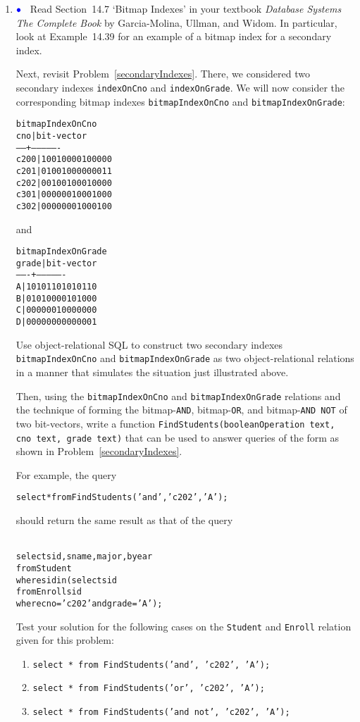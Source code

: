 \documentclass{article}
\newcommand{\bluebullet}{$\textcolor{blue}{\bullet}$}
\newcommand{\blue}[1]{{\color{blue}#1}}
\begin{document}
\begin{enumerate}[resume]
\item \bluebullet\ %
Read Section~14.7 `Bitmap Indexes' in your textbook \emph{Database Systems The Complete Book} by Garcia-Molina, Ullman, and Widom.   In particular, look at Example~14.39 for an example of a bitmap index for a secondary index.

Next, revisit Problem~\ref{secondaryIndexes}.   There, we considered two secondary indexes {\tt indexOnCno} and
{\tt indexOnGrade}.  We will now consider the corresponding bitmap indexes
{\tt bitmapIndexOnCno} and {\tt bitmapIndexOnGrade}:

{\footnotesize
\begin{alltt}
bitmapIndexOnCno
 cno  |     bit-vector     
------+----------------
 c200 | 10010000100000
 c201 | 01001000000011
 c202 | 00100100010000
 c301 | 00000010001000
 c302 | 00000001000100
\end{alltt}}
and
{\footnotesize
\begin{alltt}
bitmapIndexOnGrade
 grade |     bit-vector     
-------+----------------
 A     | 10101101010110
 B     | 01010000101000
 C     | 00000010000000
 D     | 00000000000001
\end{alltt}}

Use object-relational SQL to construct two secondary indexes {\tt bitmapIndexOnCno} and {\tt bitmapIndexOnGrade} as
two object-relational relations in a manner that simulates the situation just illustrated above.

Then, using the {\tt bitmapIndexOnCno} and {\tt bitmapIndexOnGrade} relations and the technique of forming the bitmap-{\tt AND}, bitmap-{\tt OR}, and bitmap-{\tt AND NOT} of two bit-vectors,  write a function 
{\tt FindStudents(booleanOperation text, cno text, grade text)} that can be used to answer queries of the form as shown in Problem~\ref{secondaryIndexes}.

For example, the query
{\footnotesize
\begin{alltt}
\blue{select * from FindStudents('and', 'c202', 'A');}
\end{alltt}}
should return the same result as that of the query
{\footnotesize
\begin{alltt}{\blue{
select sid, sname, major, byear 
from   Student 
where  sid in (select sid
               from   Enroll sid
               where  cno = 'c202' and grade = 'A');}}
\end{alltt}  
}


Test your solution for the following cases on the {\tt Student} and {\tt Enroll} relation given for this problem:
\begin{enumerate}
\item {\tt select * from FindStudents('and', 'c202', 'A');}
\item {\tt select * from FindStudents('or', 'c202', 'A');}
\item {\tt select * from FindStudents('and not', 'c202', 'A');}
\end{enumerate}
\end{enumerate}
\end{document}
